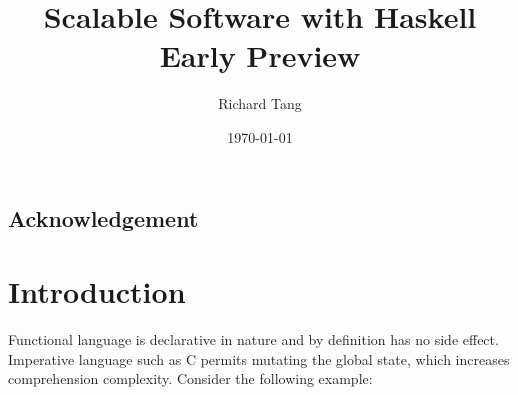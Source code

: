 \documentclass{kdp}
\title{Scalable Software with Haskell \\ Early Preview}
\author{Richard Tang}
\date{\today}
\begin{document}
\maketitle

\section*{Acknowledgement}

\tableofcontents



















\chapter{Introduction}

Functional language is declarative in nature and by definition has no side
effect. Imperative language such as C permits mutating the global state, which
increases comprehension complexity. Consider the following example:
\end{document}
